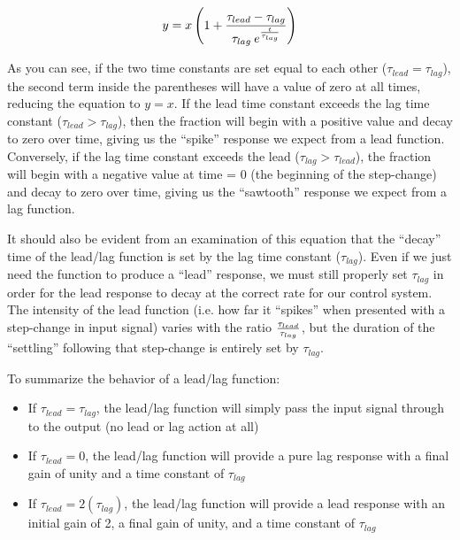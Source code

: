 $$y = x \left(1 + {{{\tau_{lead} - \tau_{lag}} \over \tau_{lag} \> e^{t \over \tau_{lag} }}} \right)$$

As you can see, if the two time constants are set equal to each other ($\tau_{lead} = \tau_{lag}$), the second term inside the parentheses will have a value of zero at all times, reducing the equation to $y = x$.  If the lead time constant exceeds the lag time constant ($\tau_{lead} > \tau_{lag}$), then the fraction will begin with a positive value and decay to zero over time, giving us the ``spike'' response we expect from a lead function.  Conversely, if the lag time constant exceeds the lead ($\tau_{lag} > \tau_{lead}$), the fraction will begin with a negative value at time = 0 (the beginning of the step-change) and decay to zero over time, giving us the ``sawtooth'' response we expect from a lag function.

It should also be evident from an examination of this equation that the ``decay'' time of the lead/lag function is set by the lag time constant ($\tau_{lag}$).  Even if we just need the function to produce a ``lead'' response, we must still properly set $\tau_{lag}$ in order for the lead response to decay at the correct rate for our control system.  The intensity of the lead function (i.e. how far it ``spikes'' when presented with a step-change in input signal) varies with the ratio $\tau_{lead} \over \tau_{lag}$, but the duration of the ``settling'' following that step-change is entirely set by $\tau_{lag}$.

\filbreak

To summarize the behavior of a lead/lag function:

\begin{itemize}
\item If $\tau_{lead} = \tau_{lag}$, the lead/lag function will simply pass the input signal through to the output (no lead or lag action at all)
\item If $\tau_{lead} = 0$, the lead/lag function will provide a pure lag response with a final gain of unity and a time constant of $\tau_{lag}$
\item If $\tau_{lead} = 2 (\tau_{lag})$, the lead/lag function will provide a lead response with an initial gain of 2, a final gain of unity, and a time constant of $\tau_{lag}$
\end{itemize}

